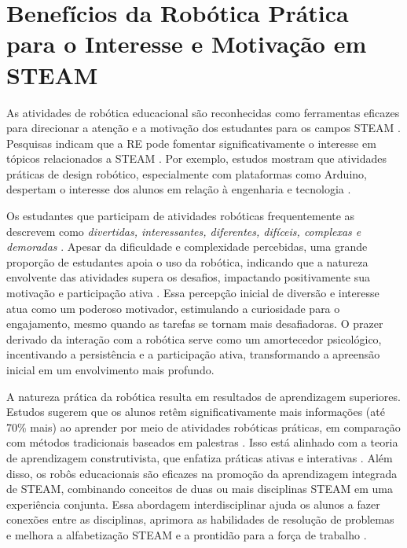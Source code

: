\documentclass[%
  12pt,%
  a4paper,%
  oneside,%
  openright,%
  sumario = abnt-6027-2012,%
  chapter = TITLE,%
  pretextualoneside,%
  fontetimes,%
  semrecuonosumario,%
  usemakeindex,%
  pardeassinaturas,%
  english,%
  french,%
  spanish,%
  brazil,%
]{utfpr}%
\begin{document}
\section{Benefícios da Robótica Prática para o Interesse e Motivação em STEAM}
As atividades de robótica educacional são reconhecidas como ferramentas eficazes para direcionar a atenção e a motivação dos estudantes para os campos STEAM \cite{cheung2024SummerLibraries}. Pesquisas indicam que a RE pode fomentar significativamente o interesse em tópicos relacionados a STEAM \cite{ross2024BeyondExhibits}. Por exemplo, estudos mostram que atividades práticas de design robótico, especialmente com plataformas como Arduino, despertam o interesse dos alunos em relação à engenharia e tecnologia \cite{cheung2024SummerLibraries}.

Os estudantes que participam de atividades robóticas frequentemente as descrevem como \emph{divertidas, interessantes, diferentes, difíceis, complexas e demoradas} \cite{cheung2024SummerLibraries}. Apesar da dificuldade e complexidade percebidas, uma grande proporção de estudantes apoia o uso da robótica, indicando que a natureza envolvente das atividades supera os desafios, impactando positivamente sua motivação e participação ativa \cite{cheung2024SummerLibraries}. Essa percepção inicial de diversão e interesse atua como um poderoso motivador, estimulando a curiosidade para o engajamento, mesmo quando as tarefas se tornam mais desafiadoras. O prazer derivado da interação com a robótica serve como um amortecedor psicológico, incentivando a persistência e a participação ativa, transformando a apreensão inicial em um envolvimento mais profundo.

A natureza prática da robótica resulta em resultados de aprendizagem superiores. Estudos sugerem que os alunos retêm significativamente mais informações (até 70\% mais) ao aprender por meio de atividades robóticas práticas, em comparação com métodos tradicionais baseados em palestras \cite{acebottImportanceRobotics2025}. Isso está alinhado com a teoria de aprendizagem construtivista, que enfatiza práticas ativas e interativas \cite{ross2024BeyondExhibits}. Além disso, os robôs educacionais são eficazes na promoção da aprendizagem integrada de STEAM, combinando conceitos de duas ou mais disciplinas STEAM em uma experiência conjunta. Essa abordagem interdisciplinar ajuda os alunos a fazer conexões entre as disciplinas, aprimora as habilidades de resolução de problemas e melhora a alfabetização STEAM e a prontidão para a força de trabalho \cite{ross2024BeyondExhibits}.
\end{document}
